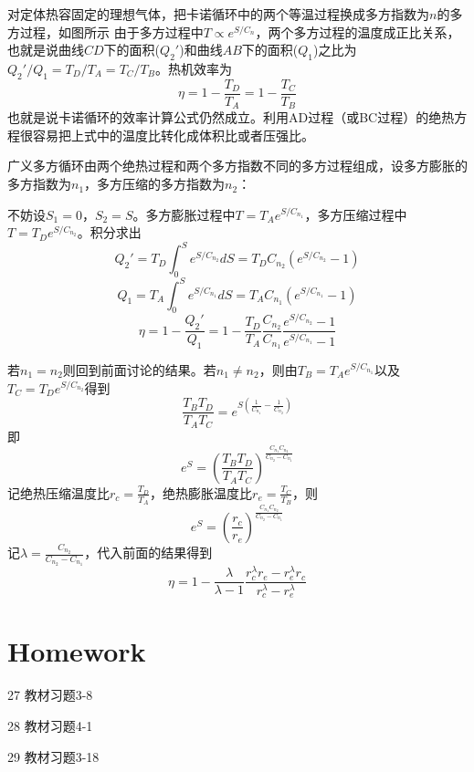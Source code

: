 \documentclass[CJK]{beamer}
\begin{document}
\begin{frame}
\bch
{}
对定体热容固定的理想气体，把卡诺循环中的两个等温过程换成多方指数为$n$的多方过程，如图所示
\emini
{}
\emini
{\small
由于多方过程中$T\propto e^{S/C_n}$，两个多方过程的温度成正比关系，也就是说曲线$CD$下的面积($Q_2'$)和曲线$AB$下的面积($Q_1$)之比为$Q_2'/Q_1=T_D/T_A = T_C/T_B$。热机效率为
$$ \eta = 1 - \frac{T_D}{T_A} = 1 - \frac{T_C}{T_B}$$
也就是说卡诺循环的效率计算公式仍然成立。利用AD过程（或BC过程）的绝热方程很容易把上式中的温度比转化成体积比或者压强比。
}
\ech
\end{frame}

\begin{frame}
\bch
{}
广义多方循环由两个绝热过程和两个多方指数不同的多方过程组成，设多方膨胀的多方指数为$n_1$，多方压缩的多方指数为$n_2$：
\emini
{}
\emini

{\scriptsize 
不妨设$S_1=0$，$S_2=S$。多方膨胀过程中$T = T_A e^{S/C_{n_1}}$，多方压缩过程中$T= T_D e^{S/C_{n_2}}$。积分求出
$$Q_2' = T_D \int_0^S e^{S/C_{n_2}} dS = T_DC_{n_2}\left(e^{S/C_{n_2}}-1\right)$$
$$Q_1  = T_A \int_0^S e^{S/C_{n_1}} dS = T_AC_{n_1}\left(e^{S/C_{n_1}}-1\right)$$
$$\eta = 1-\frac{Q_2'}{Q_1} = 1 - \frac{T_D}{T_A} \frac{C_{n_2}}{C_{n_1}} \frac{e^{S/C_{n_2}}-1}{e^{S/C_{n_1}}-1}$$
}
\ech
\end{frame}

\begin{frame}
\bch
{\scriptsize 
若$n_1=n_2$则回到前面讨论的结果。若$n_1\ne n_2$，则由$T_B = T_A e^{S/C_{n_1}}$以及$T_C = T_D e^{S/C_{n_2}}$得到
$$\frac{T_B T_D}{T_AT_C} = e^{S\left(\frac{1}{C_{n_1}} - \frac{1}{C_{n_2}}\right)}$$
即
$$ e^S = \left(\frac{T_B T_D}{T_AT_C}\right)^{\frac{C_{n_1}C_{n_2}}{C_{n_2}-C_{n_1}}}$$
记绝热压缩温度比$r_c = \frac{T_D}{T_A}$，绝热膨胀温度比$r_e = \frac{T_C}{T_B}$，则
$$ e^S = \left(\frac{r_c}{r_e}\right)^{\frac{C_{n_1}C_{n_2}}{C_{n_2}-C_{n_1}}}$$
记{\blue $\lambda = \frac{C_{n_2}}{C_{n_2}-C_{n_1}}$}，代入前面的结果得到
{\blue $$\eta =1- \frac{\lambda}{\lambda-1} \frac{r_c^\lambda r_e - r_e^\lambda r_c}{r_c^\lambda - r_e^\lambda}$$}
}
\ech
\end{frame}

\section{Homework}

\begin{frame}
\bch
\bitem
\item[27]{教材习题3-8}
\item[28]{教材习题4-1}
\item[29]{教材习题3-18}
\eitem

\ech
\end{frame}
\end{document}
